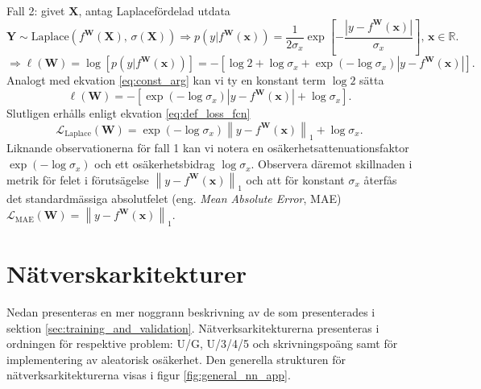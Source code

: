 Fall 2: givet $\mathbf{X}$, antag Laplacefördelad utdata
\begin{equation}
    \mathbf{Y} \sim \mathrm{Laplace}\left(f^\mathbf{W}(\mathbf{X}),\, \sigma(\mathbf{X}) \right) \Rightarrow p\left(y|f^\mathbf{W}(\mathbf{x})\right) = \frac{1}{2\sigma_x} \exp \left[-\frac{\left|y - f^\mathbf{W}(\mathbf{x})\right|}{\sigma_x} \right],\, \mathbf{x} \in \mathbb{R}.
\end{equation}
\begin{equation}
    \Rightarrow \ell(\mathbf{W}) = \log \left[p\left(y|f^\mathbf{W}(\mathbf{x})\right)\right] = -\left[\log 2 + \log \sigma_x + \exp{\left(-\log \sigma_x\right)}\left|y - f^\mathbf{W}(\mathbf{x})\right|\right].
\end{equation}
Analogt med ekvation \eqref{eq:const_arg} kan vi ty en konstant term $\log 2$ sätta
\begin{equation}
    \ell(\mathbf{W}) = -\left[\exp{\left(-\log \sigma_x\right)}\left|y - f^\mathbf{W}(\mathbf{x})\right| + \log \sigma_x\right].
\end{equation}
Slutligen erhålls enligt ekvation \eqref{eq:def_loss_fcn}
\begin{equation}
    \mathcal{L}_\mathrm{Laplace}(\mathbf{W}) = \exp{\left(-\log \sigma_x\right)}\left\|y - f^\mathbf{W}(\mathbf{x})\right\|_1 + \log \sigma_x.
\end{equation}
Liknande observationerna för fall 1 kan vi notera en osäkerhetsattenuationsfaktor $ \exp{\left(-\log \sigma_x\right)}$ och ett osäkerhetsbidrag $\log \sigma_x$. Observera däremot skillnaden i metrik för felet i förutsägelse $\left\|y - f^\mathbf{W}(\mathbf{x})\right\|_1$ och att för konstant $\sigma_x$ återfås det standardmässiga absolutfelet (eng. \emph{Mean Absolute Error}, MAE) $\mathcal{L}_\mathrm{MAE}(\mathbf{W}) = \left\|y - f^\mathbf{W}(\mathbf{x})\right\|_1$.

\newpage

\section{Nätverskarkitekturer}
\label{app:architecture_appendix}
Nedan presenteras en mer noggrann beskrivning av de som presenterades i sektion \ref{sec:training_and_validation}. Nätverksarkitekturerna presenteras i ordningen för respektive problem: U/G, U/3/4/5 och skrivningspoäng samt för implementering av aleatorisk osäkerhet. Den generella strukturen för nätverksarkitekturerna visas i figur \ref{fig:general_nn_app}.


